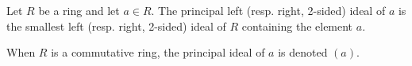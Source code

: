 \documentclass{article}
\begin{document}
Let $R$ be a ring and let $a \in R$. The principal left (resp. right, 2-sided) ideal of $a$ is the smallest left (resp. right, 2-sided) ideal of $R$ containing the element $a$.

When $R$ is a commutative ring, the principal ideal of $a$ is denoted $(a)$.
\end{document}

